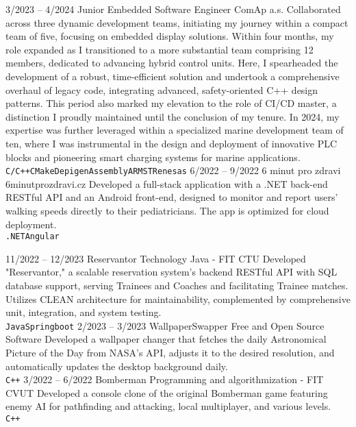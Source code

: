 \documentclass[9pt]{developercv} %
\begin{document}
\begin{entrylist}
	\entry
		{3/2023 -- 4/2024}
    	{Junior Embedded Software Engineer}
		{ComAp a.s.}
    	{Collaborated across three dynamic development teams, initiating my journey within a compact team of five, focusing on embedded display solutions. Within four months, my role expanded as I transitioned to a more substantial team comprising 12 members, dedicated to advancing hybrid control units. Here, I spearheaded the development of a robust, time-efficient solution and undertook a comprehensive overhaul of legacy code, integrating advanced, safety-oriented C++ design patterns. This period also marked my elevation to the role of CI/CD master, a distinction I proudly maintained until the conclusion of my tenure. In 2024, my expertise was further leveraged within a specialized marine development team of ten, where I was instrumental in the design and deployment of innovative PLC blocks and pioneering smart charging systems for marine applications.\\ \texttt{C/C++}\slashsep\texttt{CMake}\slashsep\texttt{Depigen}\slashsep\texttt{Assembly}\slashsep\texttt{ARM}\slashsep\texttt{ST}\slashsep\texttt{Renesas}}
	\entry
		{6/2022 -- 9/2022}
		{6 minut pro zdravi}
		{6minutprozdravi.cz}
		{Developed a full-stack application with a .NET back-end RESTful API and an Android front-end, designed to monitor and report users' walking speeds directly to their pediatricians. The app is optimized for cloud deployment.\\ \texttt{.NET}\slashsep\texttt{Angular}}
\end{entrylist}



\begin{entrylist}
	\entry
		{11/2022 -- 12/2023}
		{Reservantor}
		{Technology Java - FIT CTU}
		{Developed "Reservantor," a scalable reservation system's backend RESTful API with SQL database support, serving Trainees and Coaches and facilitating Trainee matches. Utilizes CLEAN architecture for maintainability, complemented by comprehensive unit, integration, and system testing.\\ \texttt{Java}\slashsep\texttt{Springboot}}
	\entry
		{2/2023 -- 3/2023}
		{WallpaperSwapper}
		{Free and Open Source Software}
		{Developed a wallpaper changer that fetches the daily Astronomical Picture of the Day from NASA's API, adjusts it to the desired resolution, and automatically updates the desktop background daily.\\ \texttt{C++}}
	\entry
		{3/2022 -- 6/2022}
		{Bomberman}
		{Programming and algorithmization - FIT CVUT}
		{Developed a console clone of the original Bomberman game featuring enemy AI for pathfinding and attacking, local multiplayer, and various levels.\\ \texttt{C++}}
\end{entrylist}
\end{document}
